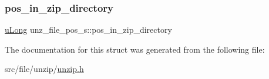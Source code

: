 \subsubsection{\texorpdfstring{pos\+\_\+in\+\_\+zip\+\_\+directory}{pos\_in\_zip\_directory}}
{\footnotesize\ttfamily \hyperlink{ioapi_8h_a50e9e9d5c30e481de822ad68fe537986}{u\+Long} unz\+\_\+file\+\_\+pos\+\_\+s\+::pos\+\_\+in\+\_\+zip\+\_\+directory}



The documentation for this struct was generated from the following file\+:\begin{DoxyCompactItemize}
\item 
src/file/unzip/\hyperlink{unzip_8h}{unzip.\+h}\end{DoxyCompactItemize}
